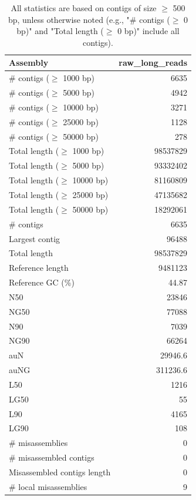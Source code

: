 \documentclass[12pt,a4paper]{article}
\begin{document}
\begin{table}[ht]
\begin{center}
\caption{All statistics are based on contigs of size $\geq$ 500 bp, unless otherwise noted (e.g., "\# contigs ($\geq$ 0 bp)" and "Total length ($\geq$ 0 bp)" include all contigs).}
\begin{tabular}{|l*{1}{|r}|}
\hline
Assembly & raw\_long\_reads \\ \hline
\# contigs ($\geq$ 1000 bp) & 6635 \\ \hline
\# contigs ($\geq$ 5000 bp) & 4942 \\ \hline
\# contigs ($\geq$ 10000 bp) & 3271 \\ \hline
\# contigs ($\geq$ 25000 bp) & 1128 \\ \hline
\# contigs ($\geq$ 50000 bp) & 278 \\ \hline
Total length ($\geq$ 1000 bp) & 98537829 \\ \hline
Total length ($\geq$ 5000 bp) & 93332402 \\ \hline
Total length ($\geq$ 10000 bp) & 81160809 \\ \hline
Total length ($\geq$ 25000 bp) & 47135682 \\ \hline
Total length ($\geq$ 50000 bp) & 18292061 \\ \hline
\# contigs & 6635 \\ \hline
Largest contig & 96488 \\ \hline
Total length & 98537829 \\ \hline
Reference length & 9481123 \\ \hline
Reference GC (\%) & 44.87 \\ \hline
N50 & 23846 \\ \hline
NG50 & 77088 \\ \hline
N90 & 7039 \\ \hline
NG90 & 66264 \\ \hline
auN & 29946.6 \\ \hline
auNG & 311236.6 \\ \hline
L50 & 1216 \\ \hline
LG50 & 55 \\ \hline
L90 & 4165 \\ \hline
LG90 & 108 \\ \hline
\# misassemblies & 0 \\ \hline
\# misassembled contigs & 0 \\ \hline
Misassembled contigs length & 0 \\ \hline
\# local misassemblies & 9 \\ \hline

\end{tabular}
\end{center}
\end{table}
\end{document}
